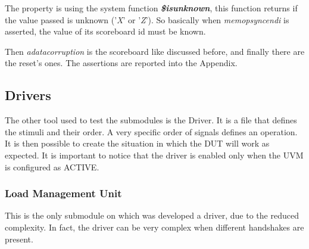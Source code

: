 The property is using the system function \textbf{\emph{\$isunknown}}, this function returns if the value passed is unknown ('\emph{X}' or '\emph{Z}'). So basically when \emph{memop\+sync\+end\+i} is asserted, the value of its scoreboard id must be known.


Then \emph{a\+data\+corruption} is the scoreboard like discussed before, and finally there are the reset's ones.
The assertions are reported into the Appendix.




\subsection{Drivers}
The other tool used to test the submodules is the Driver. It is a file that defines the stimuli and their order. A very specific order of signals defines an operation. It is then possible to create the situation in which the DUT will work as expected.
It is important to notice that the driver is enabled only when the UVM is configured as ACTIVE.

\subsubsection{Load Management Unit}
This is the only submodule on which was developed a driver, due to the reduced complexity. In fact, the driver can be very complex when different handshakes are present.


